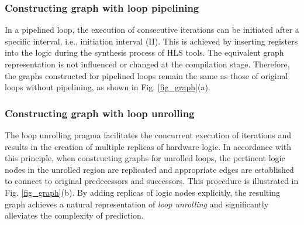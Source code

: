 \documentclass[conference]{IEEEtran}
\begin{document}
\subsubsection{Constructing graph with loop pipelining} In a pipelined loop, the execution of consecutive iterations can be initiated after a specific interval, i.e., initiation interval (II). This is achieved by inserting registers into the logic during the synthesis process of HLS tools. The equivalent graph representation is not influenced or changed at the compilation stage. Therefore, the graphs constructed for pipelined loops remain the same as those of original loops without pipelining, as shown in Fig. \ref{fig_graph}(a). %

\subsubsection{Constructing graph with loop unrolling} 
The loop unrolling pragma facilitates the concurrent execution of iterations and results in the creation of multiple replicas of hardware logic. In accordance with this principle, when constructing graphs for unrolled loops, the pertinent logic nodes in the unrolled region are replicated and appropriate edges are established to connect to original predecessors and successors. This procedure is illustrated in Fig. \ref{fig_graph}(b). By adding replicas of logic nodes explicitly, the resulting graph achieves a natural representation of \textit{loop unrolling} and significantly alleviates the complexity of prediction.
\end{document}
